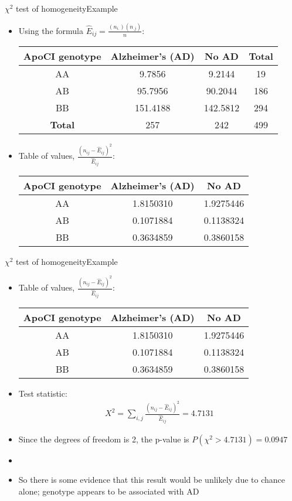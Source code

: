 \documentclass[xcolor=dvipsnames]{beamer}
\begin{document}
\begin{frame}{$\chi^2$ test of homogeneity}{Example}
	\begin{itemize}
		\item Using the formula $\hat{E}_{ij} = \frac{(n_{i.})(n_{.j})}{n}$:
		\begin{center}
			\begin{tabular}{c|cc|c}
				\hline
				\textbf{ApoCI genotype} & \textbf{Alzheimer's (AD)} & \textbf{No AD} & \textbf{Total}\\ \hline
				AA &   9.7856 &   9.2144 & 19\\
				AB &  95.7956&   90.2044 & 186\\
				BB & 151.4188 & 142.5812 & 294\\ \hline
				\textbf{Total} & 257 & 242 & 499
			\end{tabular}
		\end{center}\pause
	\item Table of values, $\frac{(n_{ij}-\hat{E}_{ij})^2}{\hat{E}_{ij}}$: \pause
			\begin{center}
		\begin{tabular}{c|cc}
			\hline
			\textbf{ApoCI genotype} & \textbf{Alzheimer's (AD)} & \textbf{No AD}\\ \hline
			AA& 1.8150310& 1.9275446\\
			AB& 0.1071884& 0.1138324\\
			BB& 0.3634859& 0.3860158\\ \hline
		\end{tabular}
	\end{center}
	\end{itemize}
\end{frame}

\begin{frame}{$\chi^2$ test of homogeneity}{Example}
\begin{itemize}
	\item Table of values, $\frac{(n_{ij}-\hat{E}_{ij})^2}{\hat{E}_{ij}}$: 
	\begin{center}
		\begin{tabular}{c|cc}
			\hline
			\textbf{ApoCI genotype} & \textbf{Alzheimer's (AD)} & \textbf{No AD}\\ \hline
			AA& 1.8150310& 1.9275446\\
			AB& 0.1071884& 0.1138324\\
			BB& 0.3634859& 0.3860158\\ \hline
		\end{tabular}
	\end{center} \pause
		\item Test statistic: \pause
		\begin{gather*}
		X^2 = \sum_{i,j} \frac{(n_{ij}-\hat{E}_{ij})^2}{\hat{E}_{ij}} = 4.7131
		\end{gather*} \pause
		\item Since the degrees of freedom is 2, the p-value is $P(\chi^2 > 4.7131)=0.0947$ \pause
		\item[]
		\item So there is some evidence that this result would be unlikely due to chance alone; genotype appears to be associated with AD
\end{itemize}
\end{frame}
\end{document}
